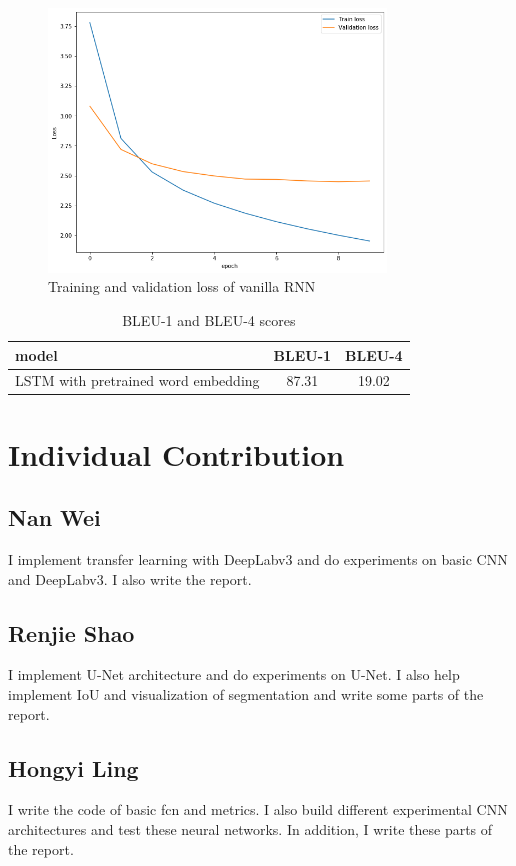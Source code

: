 \documentclass{article} %
\begin{document}
\begin{figure}[htb!]
    \centering
     \includegraphics[width=0.8\textwidth]{LSTM_pretrainedloss}
    \caption{Training and validation loss of vanilla RNN}
    \label{LSTM_pre_loss}
\end{figure}

\begin{table}[!htb]
    \caption{BLEU-1 and BLEU-4 scores}
    \label{acc}
    \centering
    \begin{tabular}{l|c|c|}
        \hline
        model & BLEU-1 & BLEU-4 \\
		\hline
		LSTM with pretrained word embedding&87.31&19.02\\
	    \hline
    \end{tabular}
\end{table}

\section{Individual Contribution}

\subsection*{Nan Wei}
I implement transfer learning with DeepLabv3 and do experiments on basic CNN and DeepLabv3. I also write the report.

\subsection*{Renjie Shao}
I implement U-Net architecture and do experiments on U-Net. I also help implement IoU and visualization of segmentation and write some parts of the report.
\subsection*{Hongyi Ling}
I write the code of basic fcn and metrics. I also build different experimental CNN architectures and test these neural networks. In addition, I write these parts of the report.



\end{document}
